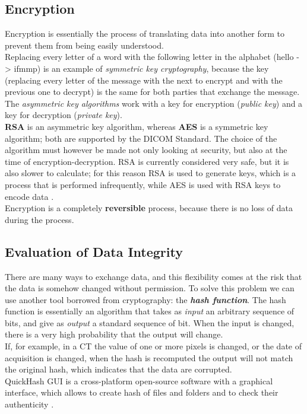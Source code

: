 \subsection{Encryption}
Encryption is essentially the process of translating data into another form to prevent them from being easily understood. \\ Replacing every letter of a word with the following letter in the alphabet (hello -> ifmmp) is an example of \emph{symmetric key cryptography}, because the key (replacing every letter of the message with the next to encrypt and with the previous one to decrypt) is the same for both parties that exchange the message. The \emph{asymmetric key algorithms} work with a key for encryption (\emph{public key}) and a key for decryption (\emph{private key}). \\ \textbf{RSA} is an asymmetric key algorithm, whereas \textbf{AES} is a symmetric key algorithm; both are supported by the DICOM Standard. The choice of the algorithm must however be made not only looking at security, but also at the time of encryption-decryption. RSA is currently considered very safe, but it is also slower to calculate; for this reason RSA is used to generate keys, which is a process that is performed infrequently, while AES is used with RSA keys to encode data \parencite{Reference25}. \\
Encryption is a completely \textbf{reversible} process, because there is no loss of data during the process.

\subsection{Evaluation of Data Integrity}
There are many ways to exchange data, and this flexibility comes at the risk that the data is somehow changed without permission. To solve this problem we can use another tool borrowed from cryptography: the \emph{\textbf{hash function}}. The hash function is essentially an algorithm that takes as \emph{input} an arbitrary sequence of bits, and give as \emph{output} a standard sequence of bit. When the input is changed, there is a very high probability that the output will change. \\
If, for example, in a CT the value of one or more pixels is changed, or the date of acquisition is changed, when the hash is recomputed the output will not match the original hash, which indicates that the data are corrupted. \\
QuickHash GUI is a cross-platform open-source software with a graphical interface, which allows to create hash of files and folders and to check their authenticity \parencite{Reference65}.

